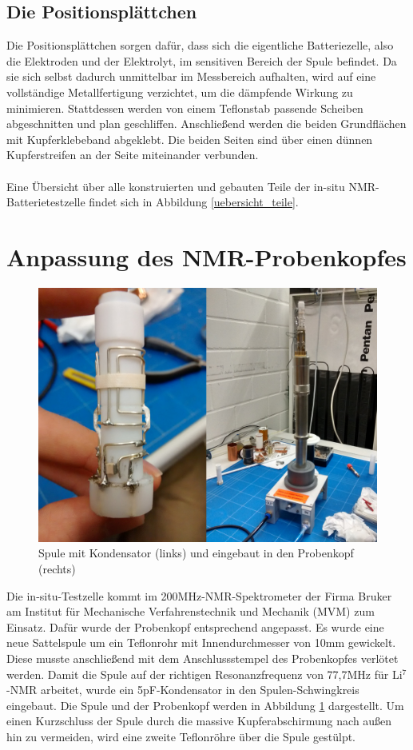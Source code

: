 \documentclass[a4paper, 11pt, headsepline,footsepline,twoside,abstract]{scrbook}
\begin{document}
\subsection{Die Positionsplättchen}
Die Positionsplättchen sorgen dafür, dass sich die eigentliche Batteriezelle, also die Elektroden und der Elektrolyt, im sensitiven Bereich der Spule befindet. Da sie sich selbst dadurch unmittelbar im Messbereich aufhalten, wird auf eine vollständige Metallfertigung verzichtet, um die dämpfende Wirkung zu minimieren. Stattdessen werden von einem Teflonstab passende Scheiben abgeschnitten und plan geschliffen. Anschließend werden die beiden Grundflächen mit Kupferklebeband abgeklebt. Die beiden Seiten sind über einen dünnen Kupferstreifen an der Seite miteinander verbunden. 
\\\\
Eine Übersicht über alle konstruierten und gebauten Teile der in-situ NMR-Batterietestzelle findet sich in Abbildung \ref{uebersicht_teile}.
\section{Anpassung des NMR-Probenkopfes}
\label{anpassung_probenkopf}
\begin{figure}
	\centering
	\includegraphics[width=0.85\columnwidth]{images/Platzhalter_Spule.jpg}
	\caption{Spule mit Kondensator (links) und eingebaut in den Probenkopf (rechts)}
	\label{spule}
\end{figure}
Die in-situ-Testzelle kommt im 200MHz-NMR-Spektrometer der Firma Bruker am Institut für Mechanische Verfahrenstechnik und Mechanik (MVM) zum Einsatz. Dafür wurde der Probenkopf entsprechend angepasst. Es wurde eine neue Sattelspule um ein Teflonrohr mit Innendurchmesser von 10mm gewickelt. Diese musste anschließend mit dem Anschlussstempel des Probenkopfes verlötet werden. Damit die Spule auf der richtigen Resonanzfrequenz von 77,7MHz für Li$^7$-NMR arbeitet, wurde ein 5pF-Kondensator in den Spulen-Schwingkreis eingebaut. Die Spule und der Probenkopf werden in Abbildung \ref{spule} dargestellt. Um einen Kurzschluss der Spule durch die massive Kupferabschirmung nach außen hin zu vermeiden, wird eine zweite Teflonröhre über die Spule gestülpt.
\end{document}
